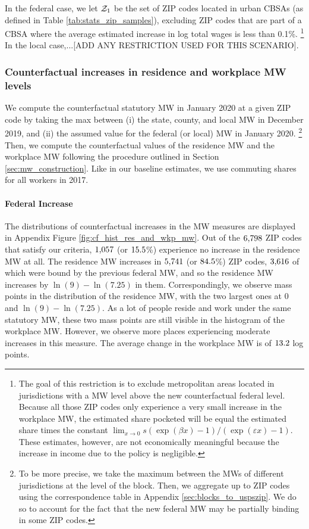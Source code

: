 In the federal case, we let $\mathcal{Z}_1$ be the set of ZIP codes located in urban CBSAs (as defined in
Table \ref{tab:stats_zip_samples}), excluding ZIP codes that are part of a CBSA 
where the average estimated increase in log total wages is less than 0.1\%.%
\footnote{\label{foot:restriction_on_zipcodes}
The goal of this restriction is to exclude metropolitan areas located 
in jurisdictions with a MW level above the new counterfactual federal level.
Because all those ZIP codes only experience a very small increase in the 
workplace MW, the estimated share pocketed will be equal the estimated
share times the constant 
$\lim_{x\to 0} s \left(\exp(\beta x)-1\right)/\left(\exp(\varepsilon x)-1\right)$.
These estimates, however, are not economically meaningful because the increase
in income due to the policy is negligible.}
In the local case,...[ADD ANY RESTRICTION USED FOR THIS SCENARIO].

\subsubsection*{Counterfactual increases in residence and workplace MW levels}
\label{sec:cf_res_and_wkp_changes}

We compute the counterfactual statutory MW in January 2020 at a given ZIP code 
by taking the max between (i) the state, county, and local MW in December 2019, 
and (ii) the assumed value for the federal (or local) MW in January 2020.%
\footnote{To be more precise, we take the maximum between the MWs of different
jurisdictions at the level of the block.
Then, we aggregate up to ZIP codes using the correspondence table in Appendix 
\ref{sec:blocks_to_uspszip}.
We do so to account for the fact that the new federal MW may be partially 
binding in some ZIP codes.}
Then, we compute the counterfactual values of the residence MW and the workplace
MW following the procedure outlined in Section \ref{sec:mw_construction}.
Like in our baseline estimates, we use commuting shares for all workers in
2017.

\paragraph{Federal Increase}
The distributions of counterfactual increases in the MW measures are displayed 
in Appendix Figure \ref{fig:cf_hist_res_and_wkp_mw}.
Out of the $\textnormal{6,798}$ ZIP codes that satisfy our criteria, 
$\textnormal{1,057}$ (or $\textnormal{15.5}$\%) experience no increase in 
the residence MW at all.
The residence MW increases in $\textnormal{5,741}$ (or $\textnormal{84.5}$\%) ZIP 
codes, $\textnormal{3,616}$ of which were bound by the previous federal MW, and 
so the residence MW increases by $\ln(9)-\ln(7.25)$ in them.
Correspondingly, we observe mass points in the distribution of the residence MW,
with the two largest ones at $0$ and $\ln(9)-\ln(7.25)$.
As a lot of people reside and work under the same statutory MW, these two mass
points are still visible in the histogram of the workplace MW.
However, we observe more places experiencing moderate increases in this measure.
The average change in the workplace MW is of $\textnormal{13.2}$ log points.

